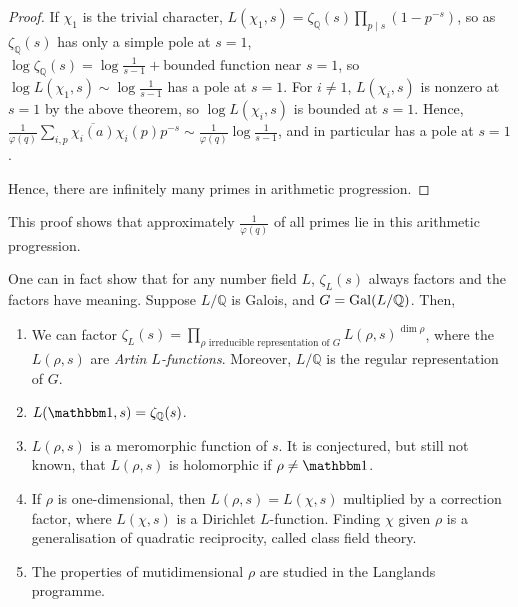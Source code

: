 \begin{proof}
    If \( \chi_1 \) is the trivial character, \( L(\chi_1, s) = \zeta_{\mathbb Q}(s) \prod_{p \mid s} (1 - p^{-s}) \), so as \( \zeta_{\mathbb Q}(s) \) has only a simple pole at \( s = 1 \), \( \log \zeta_{\mathbb Q}(s) = \log\frac{1}{s-1} + \text{bounded function} \) near \( s = 1 \), so \( \log L(\chi_1, s) \sim \log \frac{1}{s-1} \) has a pole at \( s = 1 \).
    For \( i \neq 1 \), \( L(\chi_i, s) \) is nonzero at \( s = 1 \) by the above theorem, so \( \log L(\chi_i, s) \) is bounded at \( s = 1 \).
    Hence, \( \frac{1}{\varphi(q)}\sum_{i,p}\overline{\chi_i(a)} \chi_i(p) p^{-s} \sim \frac{1}{\varphi(q)} \log \frac{1}{s-1} \), and in particular has a pole at \( s = 1 \).

    Hence, there are infinitely many primes in arithmetic progression.
\end{proof}
This proof shows that approximately \( \frac{1}{\varphi(q)} \) of all primes lie in this arithmetic progression.

One can in fact show that for any number field \( L \), \( \zeta_L(s) \) always factors and the factors have meaning.
Suppose \( L/\mathbb Q \) is Galois, and \( G = \operatorname{Gal}(L/\mathbb Q) \).
Then,
\begin{enumerate}
    \item We can factor \( \zeta_L(s) = \prod_{\rho \text{ irreducible representation of } G} L(\rho, s)^{\dim \rho} \), where the \( L(\rho, s) \) are \emph{Artin \( L \)-functions}.
    Moreover, \( L / \mathbb Q \) is the regular representation of \( G \).
    \item \( L(\mathbbm 1, s) = \zeta_{\mathbb Q}(s) \).
    \item \( L(\rho, s) \) is a meromorphic function of \( s \).
    It is conjectured, but still not known, that \( L(\rho, s) \) is holomorphic if \( \rho \neq \mathbbm 1 \).
    \item If \( \rho \) is one-dimensional, then \( L(\rho, s) = L(\chi, s) \) multiplied by a correction factor, where \( L(\chi, s) \) is a Dirichlet \( L \)-function.
    Finding \( \chi \) given \( \rho \) is a generalisation of quadratic reciprocity, called class field theory.
    \item The properties of mutidimensional \( \rho \) are studied in the Langlands programme.
\end{enumerate}
